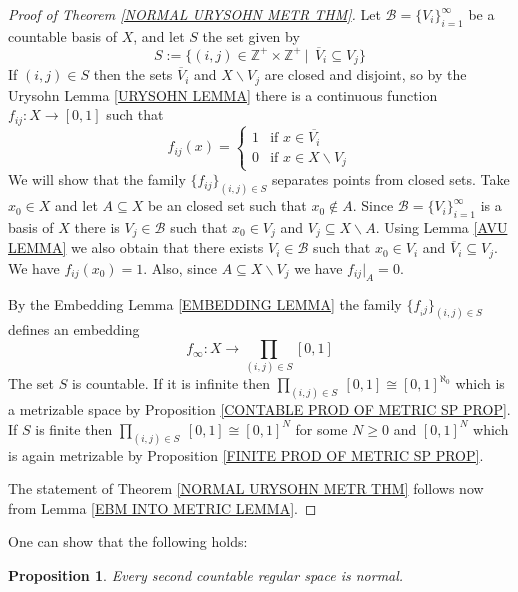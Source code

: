 \documentclass[11pt, letterpaper, oneside]{report}
\theoremstyle{pplain}
\newtheorem{proposition}[theorem]{Proposition}
\newtheorem{ITERMVALUE THM}[theorem]{Intermediate Value Theorem}
\newtheorem{HEINEBOREL THM}[theorem]{Heine-Borel Theorem}
\newtheorem{UMETR THM}[theorem]{Urysohn Metrization Theorem}
\newtheorem{UMETR2 THM}[theorem]{Urysohn Metrization Theorem (v.2)}
\theoremstyle{ddefinition}
\theoremstyle{nnn}
\newtheorem{TDA NN}[theorem]{Topological Data Analysis. }
\theoremstyle{eexercise}
\newcommand{\Z}{{\mathbb Z}}
\newcommand{\BB}{{\mathcal B}}
\newcommand{\ssmin}{\smallsetminus}
\begin{document}
\begin{proof}[Proof of Theorem \ref{NORMAL URYSOHN METR THM}]
Let $\BB= \{V_{i}\}_{i=1}^{\infty}$ be a countable basis of $X$, and let $S$ the set given by 
$$S := \{(i, j)\in \Z^{+}\times \Z^{+} \ | \ \ \overline{V}_{i} \subseteq V_{j} \}$$
 If $(i, j) \in S$ then the sets $\overline{V}_{i}$ and $X\ssmin V_{j}$ are closed and disjoint, 
so by the Urysohn Lemma  \ref{URYSOHN LEMMA} there is a continuous function 
$f_{ij} \colon X\to [0, 1]$ such that 
$$
f_{ij}(x) = 
\begin{cases}
1  & \text{if $x\in \overline{V_{i}}$} \\
0  & \text{if $x\in X\ssmin V_{j}$} 
\end{cases}
$$
We will show that the family $\{f_{ij}\}_{(i, j)\in S}$ separates points from closed sets. 
Take $x_{0}\in X$ and let $A\subseteq X$ be an closed  set
such that $x_{0}\not\in A$. 
Since $\BB= \{V_{i}\}_{i=1}^{\infty}$ is a basis of $X$ there is $V_{j}\in \BB$ such that 
$x_{0}\in V_{j}$ and $V_{j} \subseteq X\ssmin A$. 
Using Lemma \ref{AVU LEMMA} we also obtain that there exists 
$V_{i}\in \BB$ such that $x_{0}\in V_{i}$ and $\overline{V}_{i} \subseteq V_{j}$. We have 
$f_{ij}(x_{0}) =1$. Also, since $A\subseteq X\ssmin V_{j}$ we have $f_{ij}|_{A} = 0$. 

By the Embedding Lemma \ref{EMBEDDING LEMMA} the family $\{f_{_ij}\}_{(i, j)\in S}$  defines an  embedding 
$$f_{\infty} \colon X \to \prod_{(i, j)\in S} [0, 1]$$
The set $S$ is countable. If it is infinite then $\prod_{(i, j)\in S}\  [0, 1] \cong [0, 1]^{\aleph_{0}}$ which is a metrizable space
by Proposition \ref{CONTABLE PROD OF METRIC SP PROP}. 
If $S$ is finite then $\prod_{(i, j)\in S}\  [0, 1] \cong [0, 1]^{N}$ for some $N \geq 0$ and $ [0, 1]^{N}$
which is again metrizable by Proposition \ref{FINITE PROD OF METRIC SP PROP}. 

The statement of Theorem  \ref{NORMAL URYSOHN METR THM} follows now from  
Lemma \ref{EBM INTO METRIC LEMMA}.
\end{proof}



One can show that the following holds: 

\begin{proposition}
\label{REG COUNT BASIS IS NORMAL PROP}
Every second countable regular space is normal. 
\end{proposition}
\end{document}
